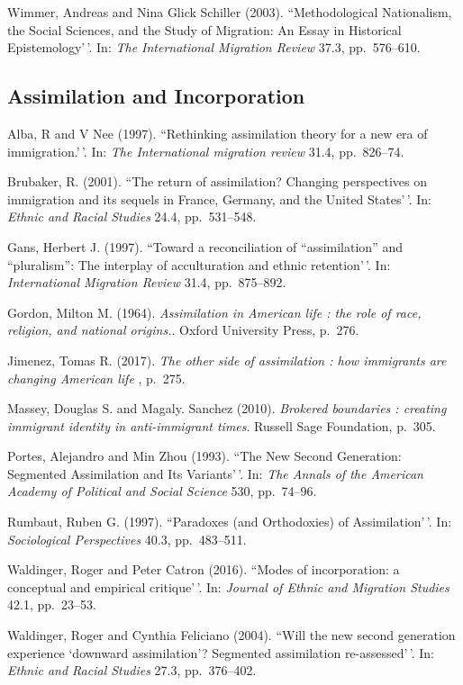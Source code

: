 \documentclass[11pt,]{article}
\begin{document}
Wimmer, Andreas and Nina Glick Schiller (2003). ``Methodological
Nationalism, the Social Sciences, and the Study of Migration: An Essay
in Historical Epistemology'\,'. In:
\emph{The International Migration Review} 37.3, pp.~576--610.

\hypertarget{assimilation-and-incorporation}{%
\subsection{Assimilation and
Incorporation}\label{assimilation-and-incorporation}}

Alba, R and V Nee (1997). ``Rethinking assimilation theory for a new era
of immigration.'\,'. In: \emph{The International migration review} 31.4,
pp.~826--74.

Brubaker, R. (2001). ``The return of assimilation? Changing perspectives
on immigration and its sequels in France, Germany, and the United
States'\,'. In: \emph{Ethnic and Racial Studies} 24.4, pp.~531--548.

Gans, Herbert J. (1997). ``Toward a reconciliation of ``assimilation''
and ``pluralism'': The interplay of acculturation and ethnic
retention'\,'. In: \emph{International Migration Review} 31.4,
pp.~875--892.

Gordon, Milton M. (1964).
\emph{Assimilation in American life : the role of race, religion, and national origins.}.
Oxford University Press, p.~276.

Jimenez, Tomas R. (2017).
\emph{The other side of assimilation : how immigrants are changing American life}
, p.~275.

Massey, Douglas S. and Magaly. Sanchez (2010).
\emph{Brokered boundaries : creating immigrant identity in anti-immigrant times}.
Russell Sage Foundation, p.~305.

Portes, Alejandro and Min Zhou (1993). ``The New Second Generation:
Segmented Assimilation and Its Variants'\,'. In:
\emph{The Annals of the American Academy of Political and Social Science}
530, pp.~74--96.

Rumbaut, Ruben G. (1997). ``Paradoxes (and Orthodoxies) of
Assimilation'\,'. In: \emph{Sociological Perspectives} 40.3,
pp.~483--511.

Waldinger, Roger and Peter Catron (2016). ``Modes of incorporation: a
conceptual and empirical critique'\,'. In:
\emph{Journal of Ethnic and Migration Studies} 42.1, pp.~23--53.

Waldinger, Roger and Cynthia Feliciano (2004). ``Will the new second
generation experience `downward assimilation'? Segmented assimilation
re-assessed'\,'. In: \emph{Ethnic and Racial Studies} 27.3,
pp.~376--402.
\end{document}
